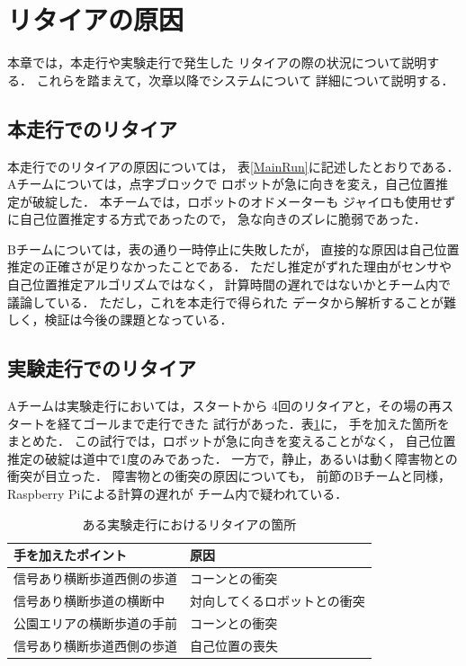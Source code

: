 \documentclass[twocolumn,9pt]{jsproceedings}
\begin{document}

\section{リタイアの原因}

本章では，本走行や実験走行で発生した
リタイアの際の状況について説明する．
これらを踏まえて，次章以降でシステムについて
詳細について説明する．

\subsection{本走行でのリタイア}\label{sub:retire}


本走行でのリタイアの原因については，
表\ref{MainRun}に記述したとおりである．
Aチームについては，点字ブロックで
ロボットが急に向きを変え，自己位置推定が破綻した．
本チームでは，ロボットのオドメーターも
ジャイロも使用せずに自己位置推定する方式であったので，
急な向きのズレに脆弱であった．

Bチームについては，表の通り一時停止に失敗したが，
直接的な原因は自己位置推定の正確さが足りなかったことである．
ただし推定がずれた理由がセンサや自己位置推定アルゴリズムではなく，
計算時間の遅れではないかとチーム内で議論している．
ただし，これを本走行で得られた
データから解析することが難しく，検証は今後の課題となっている．

\subsection{実験走行でのリタイア}


Aチームは実験走行においては，スタートから
4回のリタイアと，その場の再スタートを経てゴールまで走行できた
試行があった\cite{youtube}．表\ref{4hands}に，
手を加えた箇所をまとめた．
この試行では，ロボットが急に向きを変えることがなく，
自己位置推定の破綻は道中で1度のみであった．
一方で，静止，あるいは動く障害物との衝突が目立った．
障害物との衝突の原因についても，
前節のBチームと同様，
Raspberry Piによる計算の遅れが
チーム内で疑われている．

\begin{table}[h]
  \caption{ある実験走行におけるリタイアの箇所}
  \label{4hands}
	\begin{tabular}{|l|p{3.5cm}|}
    \hline
    手を加えたポイント & 原因 \\
    \hline
    信号あり横断歩道西側の歩道 & コーンとの衝突 \\
    \hline
    信号あり横断歩道の横断中 & 対向してくるロボットとの衝突 \\ 
    \hline
    公園エリアの横断歩道の手前 & コーンとの衝突 \\ 
    \hline
    信号あり横断歩道西側の歩道 & 自己位置の喪失 \\ 
    \hline
  \end{tabular}
\end{table}
\end{document}
